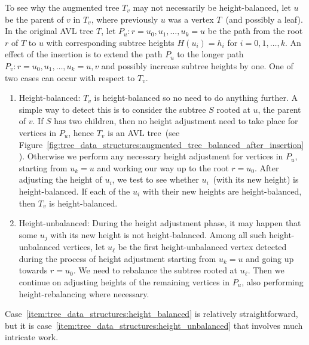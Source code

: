 To see why the augmented tree $T_v$ may not necessarily be
height-balanced, let $u$ be the parent of $v$ in $T_v$, where
previously $u$ was a vertex $T$~(and possibly a leaf). In the original
AVL tree $T$, let $P_u: r = u_0, u_1, \dots, u_k = u$ be the path from
the root $r$ of $T$ to $u$ with corresponding subtree heights $H(u_i)
= h_i$ for $i = 0, 1, \dots, k$. An effect of the insertion is to
extend the path $P_u$ to the longer path
$P_v: r = u_0, u_1, \dots, u_k = u, v$ and possibly increase subtree
heights by one. One of two cases can occur with respect to $T_v$.
\begin{enumerate}
\item\label{item:tree_data_structures:height_balanced}
  Height-balanced: $T_v$ is height-balanced so no need to do anything
  further. A simple way to detect this is to consider the subtree $S$
  rooted at $u$, the parent of $v$. If $S$ has two children, then no
  height adjustment need to take place for vertices in $P_u$, hence
  $T_v$ is an AVL tree~(see
  Figure~\ref{fig:tree_data_structures:augmented_tree_balanced_after_insertion}).
  Otherwise we perform any necessary height adjustment for vertices in
  $P_u$, starting from $u_k = u$ and working our way up to the root
  $r = u_0$. After adjusting the height of $u_i$, we test to see
  whether $u_i$~(with its new height) is height-balanced. If each of
  the $u_i$ with their new heights are height-balanced, then $T_v$ is
  height-balanced.

\item\label{item:tree_data_structures:height_unbalanced}
  Height-unbalanced: During the height adjustment phase, it may happen
  that some $u_j$ with its new height is not height-balanced. Among
  all such height-unbalanced vertices, let $u_\ell$ be the first
  height-unbalanced vertex detected during the process of height
  adjustment starting from $u_k = u$ and going up towards
  $r = u_0$. We need to rebalance the subtree rooted at $u_\ell$. Then
  we continue on adjusting heights of the remaining vertices in
  $P_u$, also performing height-rebalancing where necessary.
\end{enumerate}
Case~\ref{item:tree_data_structures:height_balanced} is relatively
straightforward, but it is
case~\ref{item:tree_data_structures:height_unbalanced} that involves
much intricate work.

